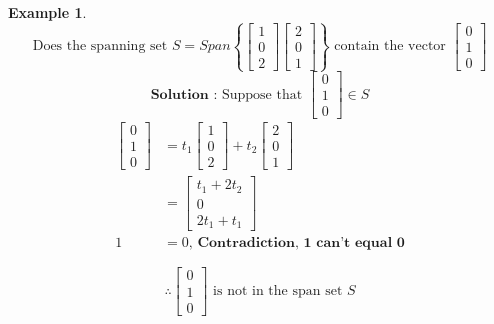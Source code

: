 \documentclass[twoside]{article}
\newtheorem{ex}[theorem]{Example}
\begin{document}
\begin{ex}
\[ \text {Does the spanning set } S = Span \left\{ \begin{bmatrix} 1 \\ 0 \\ 2 \end{bmatrix} \begin{bmatrix} 2 \\ 0 \\ 1 \end{bmatrix} \right\} \text{ contain the vector } \begin{bmatrix} 0 \\ 1 \\ 0 \end{bmatrix} \]
\[ \textbf{Solution : } \text{Suppose that } \begin{bmatrix} 0 \\ 1 \\ 0\end{bmatrix} \in S \]
\begin{equation}
\begin{aligned}
\begin{bmatrix} 0 \\ 1 \\ 0\end{bmatrix} & =  t_1\begin{bmatrix} 1 \\ 0 \\ 2 \end{bmatrix} + t_2 \begin{bmatrix} 2 \\ 0 \\ 1 \end{bmatrix} \\
& = \begin{bmatrix} t_1 + 2t_2 \\ 0 \\ 2t_1 + t_1\end{bmatrix} \\
1 & = 0 \textbf{, Contradiction, 1 can't equal 0}
\end{aligned}
\end{equation}

\[ \therefore  \begin{bmatrix} 0 \\ 1 \\ 0 \end{bmatrix} \text{ is not in the span set } S \]

\end{ex} 
\end{document}
